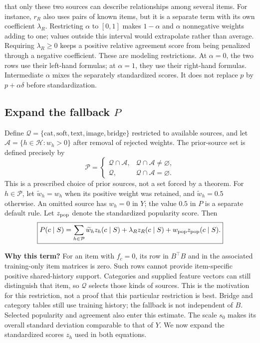 \documentclass[11pt,a4paper]{article}
\newcommand{\why}{\par\textbf{Why this term?} }
\numberwithin{equation}{section}
\begin{document}
that only these two sources can describe relationships among several items. For instance,
$r_R$ also uses pairs of known items, but it is a separate term with its own coefficient $\lambda_R$.
Restricting $\alpha$ to $[0,1]$ makes $1-\alpha$ and $\alpha$ nonnegative weights adding to one; values outside this interval would extrapolate rather than average. Requiring $\lambda_R\ge0$ keeps a positive relative agreement score from being penalized through a negative coefficient. These are modeling restrictions. At $\alpha=0$, the two rows use their left-hand formulas; at $\alpha=1$, they use their right-hand
formulas. Intermediate $\alpha$ mixes the separately standardized scores. It does not replace
$p$ by $p+\alpha\delta$ before standardization.

\subsection{Expand the fallback $P$}
Define $\mathcal Q=\{\mathrm{cat,soft,text,image,bridge}\}$ restricted to available
sources, and let $\mathcal A=\{h\in\mathcal H:w_h>0\}$ after removal of rejected weights.
The prior-source set is defined precisely by
\[
\mathcal P=\begin{cases}\mathcal Q\cap\mathcal A,&\mathcal Q\cap\mathcal A\ne\varnothing,\\
\mathcal Q,&\mathcal Q\cap\mathcal A=\varnothing.\end{cases}
\]
This is a prescribed choice of prior sources, not a set forced by a theorem. For $h\in\mathcal P$, let $\widetilde w_h=w_h$ when its
positive weight was retained, and $\widetilde w_h=0.5$ otherwise. An omitted source has $w_h=0$ in $Y$; the value $0.5$ in $P$ is a separate default rule. Let $z_{\rm pop}$ denote
the standardized popularity score. Then
\begin{equation}\label{P}
 \boxed{P(c\mid S)=\sum_{h\in\mathcal P}\widetilde w_hz_h(c\mid S)
       +\lambda_R z_R(c\mid S)+w_{\rm pop}z_{\rm pop}(c\mid S).}
\end{equation}
\why For an item with $f_c=0$, its row in $B^\top B$ and in the associated training-only
item matrices is zero. Such rows cannot provide item-specific positive shared-history
support. Categories and supplied feature vectors can still distinguish that item, so
$\mathcal Q$ selects those kinds of sources. This is the motivation for this restriction,
not a proof that this particular restriction is best. Bridge and category tables still
use training history; the fallback is not independent of $B$. Selected popularity and agreement also enter this estimate. The scale
$s_0$ makes its overall standard deviation comparable to that of $Y$. We now expand the standardized
scores $z_h$ used in both equations.
\end{document}
